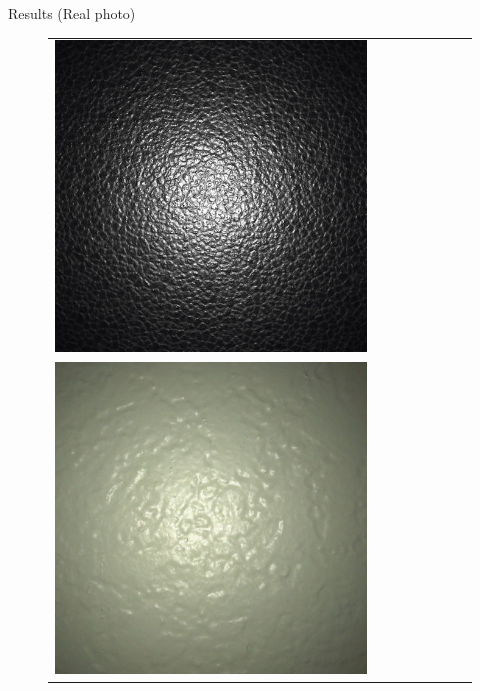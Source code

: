 \documentclass[final]{beamer}
\newlength{\twocolwid}
\newlength{\resultwidth}
\begin{document}
\begin{frame}[t]
\begin{columns}[t]
\begin{column}{\twocolwid}
\begin{block}{Results (Real photo)}
\begin{figure}[t]
\begin{tabular}{ccrclccc}
            		\includegraphics[width=\resultwidth]{images/real/leather/bad1.jpg}
            		\\
            		\includegraphics[width=\resultwidth]{images/real/plaster/target.jpg} &

\end{tabular}
\end{figure}
\end{block}
\end{column}
\end{columns}
\end{frame}
\end{document}
